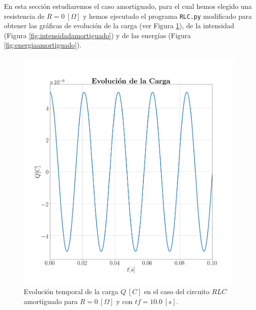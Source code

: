 \documentclass[journal]{IEEEtran}
\begin{document}
En esta sección estudiaremos el caso amortiguado, para el cual hemos elegido una resistencia de $R=0~[\Omega]$ y hemos ejecutado el programa \texttt{RLC.py} modificado para obtener las gráficas de evolución de la carga (ver Figura \ref{fig:cargaamortiguado}), de la intensidad (Figura \ref{fig:intensidadamortiguado}) y de las energías (Figura \ref{fig:energiaamortiguado}).

\newpage

\begin{figure}[!htb]
    \centering
    \includegraphics[width=\linewidth,trim={70 70 70 70},clip]{cargaamortiguado.png}
    \caption{Evolución temporal de la carga $Q~[C]$ en el caso del circuito $RLC$ amortiguado para $R=0~[\Omega]$ y con $tf=10.0~[s]$.}
    \label{fig:cargaamortiguado}
\end{figure}
\end{document}
